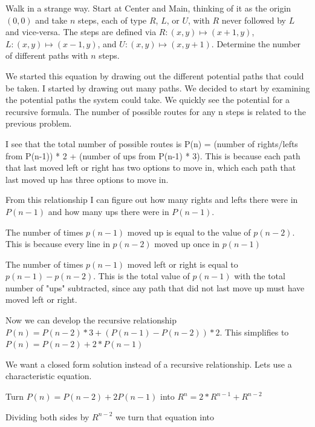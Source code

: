 \documentclass[10pt, AMS Euler]{article}
\begin{document}
	\vspace{1em}

	\bigskip
	
	  Walk in a strange way.  Start at Center and Main, thinking of it as the origin $(0,0)$ and take $n$ steps, each of type $R$, $L$, or $U$, with $R$ never followed by $L$ and vice-versa. The steps are defined via $R:(x,y) \mapsto (x+1,y)$, $L:(x,y) \mapsto (x-1,y)$, and $U:(x,y) \mapsto (x, y+1)$.  
	Determine the number of different paths with $n$ steps.

	\bigskip
	\noindent We started this equation by drawing out the different potential paths that could be taken. I started by drawing out many paths. We decided to start by examining the potential paths the system could take. We quickly see the potential for a recursive formula. The number of possible routes for any n steps is related to the previous problem. 

	\bigskip
	\noindent
	I see that the total number of possible routes is P(n) = (number of rights/lefts from P(n-1)) * 2 + (number of ups from P(n-1) * 3). This is because each path that last moved left or right has two options to move in, which each path that last moved up has three options to move in. 

	\bigskip
	\noindent
	From this relationship I can figure out how many rights and lefts there were in $P(n-1)$ and how many ups there were in $P(n-1)$. 
	
	\bigskip
	\noindent
	The number of times $p(n-1)$ moved up is equal to the value of $p(n-2)$. This is because every line in $p(n-2)$ moved up once in $p(n-1)$

	\bigskip
	\noindent
	The number of times $p(n-1)$ moved left or right is equal to $p(n-1) - p(n-2)$. This is the total value of $p(n-1)$ with the total number of "ups" subtracted, since any path that did not last move up must have moved left or right.

	\bigskip
	\noindent
	Now we can develop the recursive relationship $P(n) = P(n-2) * 3 + (P(n-1) - P(n-2)) * 2$. This simplifies to $P(n) = P(n-2) + 2*P(n-1)$

	\bigskip
	\noindent
	We want a closed form solution instead of a recursive relationship. Lets use a characteristic equation. 

	\bigskip
	\noindent
	Turn $P(n) = P(n-2) + 2P(n-1)$ into $R^n = 2*R^{n-1} + R^{n-2}$

	\bigskip
	\noindent
	Dividing both sides by $R^{n-2}$ we turn that equation into
\end{document}
